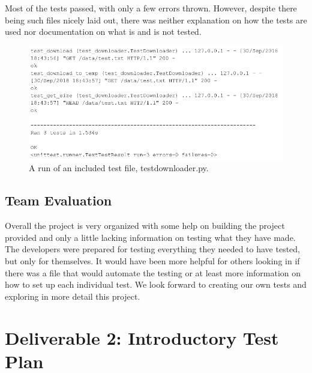 \documentclass{article}
\begin{document}
Most of the tests passed, with only a few errors thrown. However, despite there being such files nicely laid out, there was neither explanation on how the tests are used nor documentation on what is and is not tested.
\begin{figure}
\centering
\includegraphics[scale=0.5]{../imgs/Figure1.png}
\caption{A run of an included test file, test\textunderscore downloader.py.}
\label{Figure1}
\end{figure}
\subsection{Team Evaluation}
Overall the project is very organized with some help on building the project provided and only a little lacking information on testing what they have made. The developers were prepared for testing everything they needed to have tested, but only for themselves. It would have been more helpful for others looking in if there was a file that would automate the testing or at least more information on how to set up each individual test. We look forward to creating our own tests and exploring in more detail this project.
\section{Deliverable 2: Introductory Test Plan}
\end{document}
